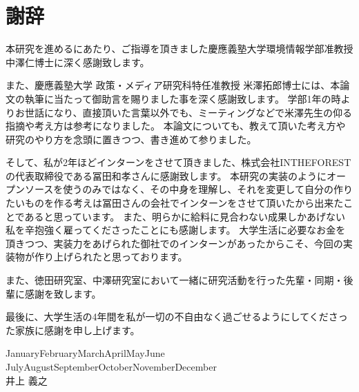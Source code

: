   \newcommand{\fulltoday}{\number\day\space \ifcase\month\or
    January\or February\or March\or April\or May\or June\or
    July\or August\or September\or October\or November\or December\fi
    \space\number\year}

\chapter*{謝辞}
本研究を進めるにあたり、ご指導を頂きました慶應義塾大学環境情報学部准教授中澤仁博士に深く感謝致します。

また、慶應義塾大学 政策・メディア研究科特任准教授 米澤拓郎博士には、本論文の執筆に当たって御助言を賜りました事を深く感謝致します。
学部1年の時よりお世話になり、直接頂いた言葉以外でも、ミーティングなどで米澤先生の仰る指摘や考え方は参考になりました。
本論文についても、教えて頂いた考え方や研究のやり方を念頭に置きつつ、書き進めて参りました。

そして、私が2年ほどインターンをさせて頂きました、株式会社INTHEFORESTの代表取締役である冨田和孝さんに感謝致します。
本研究の実装のようにオープンソースを使うのみではなく、その中身を理解し、それを変更して自分の作りたいものを作る考えは冨田さんの会社でインターンをさせて頂いたから出来たことであると思っています。
また、明らかに給料に見合わない成果しかあげない私を辛抱強く雇ってくださったことにも感謝します。
大学生活に必要なお金を頂きつつ、実装力をあげられた御社でのインターンがあったからこそ、今回の実装物が作り上げられたと思っております。

また、徳田研究室、中澤研究室において一緒に研究活動を行った先輩・同期・後輩に感謝を致します。

最後に、大学生活の4年間を私が一切の不自由なく過ごせるようにしてくださった家族に感謝を申し上げます。

\begin{flushright}
\fulltoday\\
井上 義之
\end{flushright}
